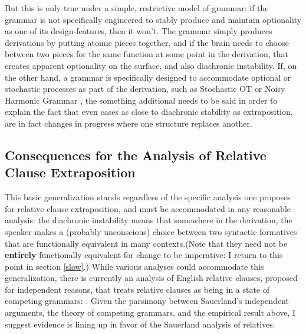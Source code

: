 But this is only true under a simple, restrictive model of grammar: if the grammar is not specifically engineered to stably produce and maintain optionality as one of its design-features, then it won't. The grammar simply produces derivations by putting atomic pieces together, and if the brain needs to choose between two pieces for the same function at some point in the derivation, that creates apparent optionality on the surface, and also diachronic instability. If, on the other hand, a grammar is specifically designed to accommodate optional or stochastic processes as part of the derivation, such as Stochastic OT \citep{boersmahayes2001} or Noisy Harmonic Grammar \citep[][and much subsequent work]{boersmapater2008, pater2008}, the something additional needs to be said in order to explain the fact that even cases as close to diachronic stability as extraposition, are in fact changes in progress where one structure replaces another.

\subsection{Consequences for the Analysis of Relative Clause Extraposition}

This basic generalization stands regardless of the specific analysis one proposes for relative clause extraposition, and must be accommodated in any reasonable analysis: the diachronic instability means that somewhere in the derivation, the speaker makes a (probably unconscious) choice between two syntactic formatives that are functionally equivalent in many contexts.(Note that they need not be \textbf{entirely} functionally equivalent for change to be imperative: I return to this point in section \ref{slow}.) While various analyses could accommodate this generalization, there is currently an analysis of English relative clauses, proposed for independent reasons, that treats relative clauses as being in a state of competing grammars: \citet{sauerland2003}. Given the parsimony between Sauerland's independent arguments, the theory of competing grammars, and the empirical result above, I suggest evidence is lining up in favor of the Sauerland analysis of relatives.

